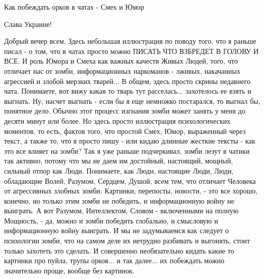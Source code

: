  
 
 
 
 


Как побеждать орков в чатах - Смех и Юмор

Слава Украине!

Добрый вечер всем. Здесь небольшая иллюстрация по поводу того, что я раньше
писал - о том, что в чатах просто можно ПИСАТЬ ЧТО ВЗБРЕДЕТ В ГОЛОВУ И ВСЕ. И
роль Юмора и Смеха как важных качеств Живых Людей, того, что отличает нас от
зомби, информационных наркоманов - лживых, накачанных агрессией и злобой
мерзких тварей... В общем, здесь просто скрины недавнего чата. Понимаете, вот
вижу какая то тварь тут расселась...  захотелось ее взять и выгнать. Ну, насчет
выгнать - если бы я еще немножко постарался, то выгнал бы, понятное дело.
Обычно этот процесс изгнания зомби может занять у меня до десяти минут или
более. Но здесь просто иллюстрация психологических моментов, то есть, фактов
того, что простой Смех, Юмор, выраженный через текст, а также то, что я просто
пишу - или кидаю длинные жесткие тексты - как это все влияет на зомби? Так я
уже раньше подчеркивал, зомби лезут в чатики так активно, потому что мы не даем
им достойный, настоящий, мощный, сильный отпор как Люди. Понимаете, как Люди,
настоящие Люди, Люди, обладающие Волей, Разумом, Сердцем, Душой, всем тем, что
отличает Человека от агрессивных злобных зомби. Картинки, перепосты, новости, -
это все хорошо, конечно, но только этим зомби не победить, и информационную
войну не выиграть. А вот Разумом, Интеллектом, Словом - включенными на полную
Мощность, - да, можно и зомби победить глобально, и смысловую и информационную
войну выиграть. И мы не задумываемся как следует о психологии зомби, что на
самом деле их нетрудно разбивать и выгонять, стоит только захотеть это сделать.
И совершенно необязательно кидать какие то картинки про пуйла, трупы орков... и
так далее...  их побеждать можно значительно проще, вообще без картинок.

